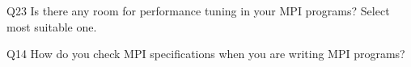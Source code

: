 \begin{description}%
\item{Q23} Is there any room for performance tuning in your MPI programs? Select most suitable one.%
\item{Q14} How do you check MPI specifications when you are writing MPI programs?%
\end{description}%
